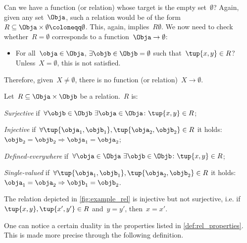 \begin{example}
    Can we have a function (or relation) whose target is the empty set~$\emptyset$? Again, given any set~$\Obja$, such a relation would be of the form~$R\subseteq \Obja\times \emptyset\coloneqq \emptyset$. This, again, implies~$R\emptyset$. We now need to check whether~$R=\emptyset$ corresponds to a function~$\Obja \to \emptyset$:
    \begin{itemize}
        \item For all~$\obja\in \Obja$, $\exists \objb\in \Objb=\emptyset$ such that~$\tup{x,y}\in R$? Unless~$X=\emptyset$, this is not satisfied.
    \end{itemize}
    Therefore, given~$X\neq \emptyset$, there is no function (or relation)~$X\to \emptyset$.
\end{example}

\begin{definition}
    \label{def:rel_properties}
    Let~$R\subseteq \Obja \times \Objb$ be a relation.~$R$ is:
    \begin{compactenum}
        \item \emph{Surjective} if~$\forall \objb\in \Objb \ \exists \obja\in \Obja\colon \tup{x,y}\in R$;
        \item \emph{Injective} if~$\forall \tup{\obja_1,\objb_1},\tup{\obja_2,\objb_2}\in R$ it holds:~$\objb_2=\objb_2 \Rightarrow \obja_1=\obja_2$;
        \item \emph{Defined-everywhere} if~$\forall \obja\in \Obja \ \exists \objb \in \Objb\colon \tup{x,y}\in R$;
        \item \emph{Single-valued} if~$\forall \tup{\obja_1,\objb_1},\tup{\obja_2,\objb_2}\in R$ it holds:~$\obja_1=\obja_2\Rightarrow \objb_1=\objb_2$.
    \end{compactenum}
\end{definition}

\begin{example}
    The relation depicted in \cref{fig:example_rel} is injective but not surjective, i.e. if~$\tup{x,y},\tup{x',y'}\in R$ and~$y=y'$, then~$x=x'$.
\end{example}

One can notice a certain duality in the properties listed in \cref{def:rel_properties}. This is made more precise through the following definition.

